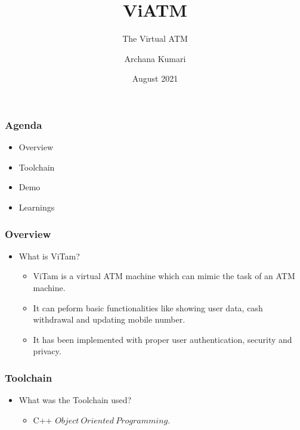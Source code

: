 \documentclass[12pt]{beamer}
\author{Archana Kumari}
\title{ViATM}
\subtitle{The Virtual ATM}
\date{August 2021}
\begin{document}
\begin{frame}
\maketitle
\end{frame}

\begin{frame}
    \frametitle{Agenda} 
             \begin{itemize}
             \item {Overview}
             \item {Toolchain}
             \item {Demo}
             \item {Learnings}
          
             \end{itemize}         
\end{frame} 

\begin{frame}
    \frametitle{Overview}
    \begin{itemize}
        \item  {What is ViTam?}
             \begin{itemize}
             \item {ViTam is a virtual ATM machine which can mimic the task of an ATM machine.}
             \item{It can peform basic functionalities like showing user data, cash withdrawal and updating mobile number.}
             \item{It has been implemented with proper user authentication, security and privacy.}
            
             \end{itemize}     
\end{itemize}       
\end{frame} 
\begin{frame}
    \frametitle{Toolchain}
    \begin{itemize}          
        \item What was the Toolchain used?
             \begin{itemize}
             \item { C++ \(Object \ Oriented \ Programming.\) }  
             \end{itemize}
    \end{itemize}       
\end{frame}     
\end{document}
